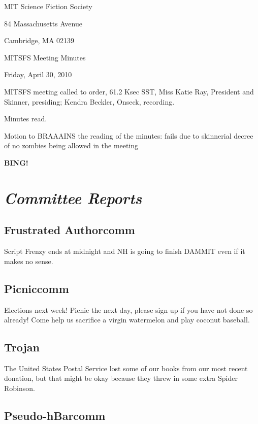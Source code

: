\documentclass[10pt]{article}
\newcommand{\bing}{{\bf BING!} }
\newcommand{\goto}[1]{\bing \vskip 12pt \section*{{\em{#1}}}}
\newcommand{\skinner}{Miss Katie Ray, President and Skinner}
\newcommand{\onseck}{Kendra Beckler, Onseck}
\newcommand{\meetingdate}{Friday, April 30, 2010}
\begin{document}
\begin{center}

MIT Science Fiction Society

84 Massachusetts Avenue

Cambridge, MA 02139

\vspace{12pt}

MITSFS Meeting Minutes

\meetingdate

\end{center}

\vspace{18pt}

\setlength{\parskip}{6pt}

\noindent
MITSFS meeting called to order, 61.2 Ksec SST,
\skinner, presiding; \onseck, recording.

Minutes read.

Motion to BRAAAINS the reading of the minutes: fails due to skinnerial decree of no zombies being allowed in the meeting

\goto{Committee Reports}

\subsection*{Frustrated Authorcomm}

Script Frenzy ends at midnight and NH is going to finish DAMMIT even if it makes no sense.

\subsection*{Picniccomm}

Elections next week!  Picnic the next day, please sign up if you have not done so already!  Come help us sacrifice a virgin watermelon and play coconut baseball.

\subsection*{Trojan}

The United States Postal Service lost some of our books from our most recent donation, but that might be okay because they threw in some extra Spider Robinson.

\subsection*{Pseudo-hBarcomm}
\end{document}
